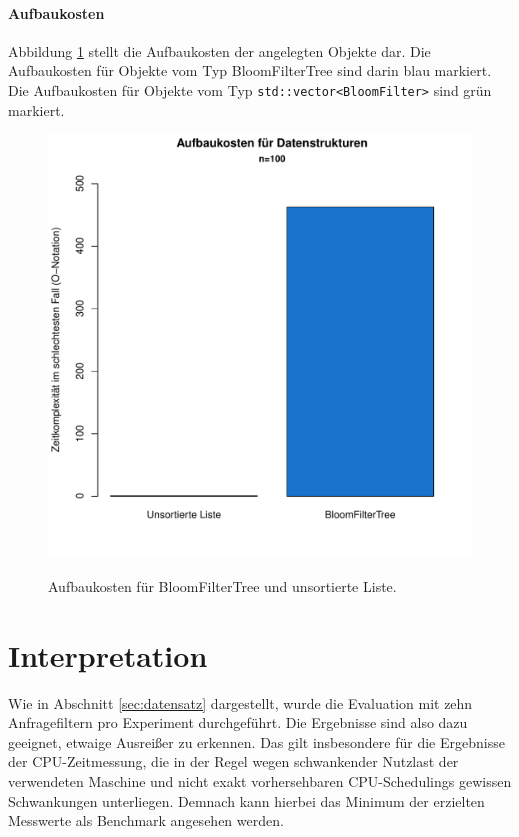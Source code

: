 \paragraph*{Aufbaukosten}
Abbildung \ref{fig:pic19} stellt die Aufbaukosten der angelegten Objekte dar. Die Aufbaukosten für Objekte vom Typ BloomFilterTree sind darin blau markiert. Die Aufbaukosten für Objekte vom Typ \texttt{std::vector<BloomFilter>} sind grün markiert. 
\begin{figure}[hptb]
	\centering
	\includegraphics[scale=0.7]{pictures/cost.pdf}\\
	\caption[Aufbaukosten für BloomFilterTree und unsortierte Liste]{Aufbaukosten für BloomFilterTree und unsortierte Liste.}\label{fig:pic19}
\end{figure}
\newpage
\section{Interpretation}\label{sec:interpretation}
Wie in Abschnitt \ref{sec:datensatz} dargestellt, wurde die Evaluation mit zehn Anfragefiltern pro Experiment durchgeführt. Die Ergebnisse sind also dazu geeignet, etwaige Ausreißer zu erkennen. Das gilt insbesondere für die Ergebnisse der CPU-Zeitmessung, die in der Regel wegen schwankender Nutzlast der verwendeten Maschine und nicht exakt vorhersehbaren CPU-Schedulings gewissen Schwankungen unterliegen. Demnach kann hierbei das Minimum der erzielten Messwerte als Benchmark angesehen werden. 
